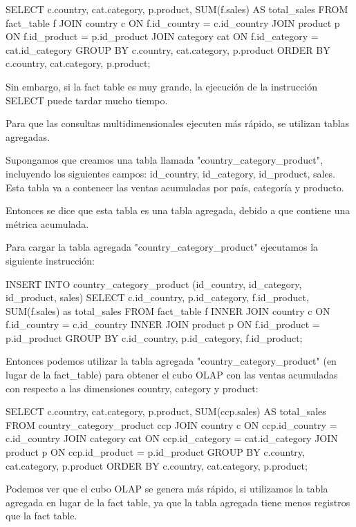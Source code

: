 \begin{SourceCode}
SELECT c.country, cat.category, p.product, SUM(f.sales) AS total_sales
FROM fact_table f
JOIN country c ON f.id_country = c.id_country
JOIN product p ON f.id_product = p.id_product
JOIN category cat ON f.id_category = cat.id_category
GROUP BY c.country, cat.category, p.product
ORDER BY c.country, cat.category, p.product;
\end{SourceCode}

Sin embargo, si la fact table es muy grande, la ejecución de la instrucción SELECT puede tardar mucho tiempo.

Para que las consultas multidimensionales ejecuten más rápido, se utilizan tablas agregadas.

Supongamos que creamos una tabla llamada "country\_category\_product", incluyendo los siguientes campos: id\_country, id\_category, id\_product, sales. Esta tabla va a conteneer las ventas acumuladas por país, categoría y producto.

Entonces se dice que esta tabla es una tabla agregada, debido a que contiene una métrica acumulada.

Para cargar la tabla agregada "country\_category\_product" ejecutamos la siguiente instrucción:

\begin{SourceCode}
INSERT INTO country_category_product (id_country, id_category, id_product, sales)
SELECT c.id_country, p.id_category, f.id_product, SUM(f.sales) as total_sales
FROM fact_table f
INNER JOIN country c ON f.id_country = c.id_country
INNER JOIN product p ON f.id_product = p.id_product
GROUP BY c.id_country, p.id_category, f.id_product;
\end{SourceCode}

Entonces podemos utilizar la tabla agregada "country\_category\_product" (en lugar de la fact\_table) para obtener el cubo OLAP con las ventas acumuladas con respecto a las dimensiones country, category y product:

\begin{SourceCode}
SELECT c.country, cat.category, p.product, SUM(ccp.sales) AS total_sales
FROM country_category_product ccp
JOIN country c ON ccp.id_country = c.id_country
JOIN category cat ON ccp.id_category = cat.id_category
JOIN product p ON ccp.id_product = p.id_product
GROUP BY c.country, cat.category, p.product
ORDER BY c.country, cat.category, p.product;
\end{SourceCode}

Podemos ver que el cubo OLAP se genera más rápido, si utilizamos la tabla agregada en lugar de la fact table, ya que la tabla agregada tiene menos registros que la fact table.

